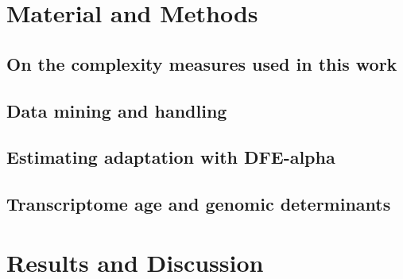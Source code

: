 \documentclass[officiallayout]{tktla_modified}
\begin{document}

\chapter{Material and Methods}
	\section{On the complexity measures used in this work}
	

	\section{Data mining and handling}
	

	\section{Estimating adaptation with DFE-alpha}
	

	\section{Transcriptome age and genomic determinants}
	

%
\clearpage

	
\chapter{Results and Discussion}

%	
%	
\end{document}
